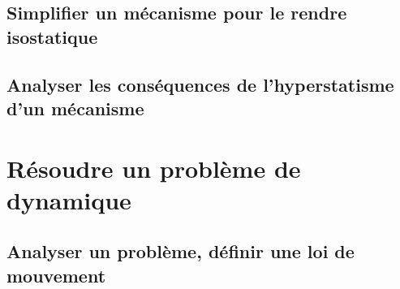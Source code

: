 \graphicspath{{\repStyle/png/}{../CHS/CHS-03-HS/69_TrainA350/images/}} 
 
 
\graphicspath{{\repStyle/png/}{../CHS/CHS-03-HS/71_Robovolc/images/}} 
 
 
\graphicspath{{\repStyle/png/}{../CHS/CHS-03-HS/71_Robovolc_02/images/}} 
 
 
\graphicspath{{\repStyle/png/}{../CHS/CHS-03-HS/72_Tripteor/images/}} 
 
 
\graphicspath{{\repStyle/png/}{../CHS/CHS-03-HS/81_Piaggio/images/}} 
 
 
\graphicspath{{\repStyle/png/}{../CHS/CHS-03-HS/82_MAV/images/}} 
 
 
\graphicspath{{\repStyle/png/}{../CHS/CHS-03-HS/83_Roburoc/images/}} 
 
 
\graphicspath{{\repStyle/png/}{../CHS/CHS-03-HS/84_Nacelle/images/}} 
 
 
\section{Simplifier un mécanisme pour le rendre isostatique} 
\section{Analyser les conséquences de l'hyperstatisme d'un mécanisme} 
\setchapterpreamble[u]{\margintoc} 
\chapter{Résoudre un problème de dynamique} 
\section{Analyser un problème, définir une loi de mouvement} 
\graphicspath{{\repStyle/png/}{../DYN/DYN-01/01_T/images/}} 
 
 
\graphicspath{{\repStyle/png/}{../DYN/DYN-01/02_R/images/}} 
 
 
\graphicspath{{\repStyle/png/}{../DYN/DYN-01/14_Sympact/images/}} 
 
 
